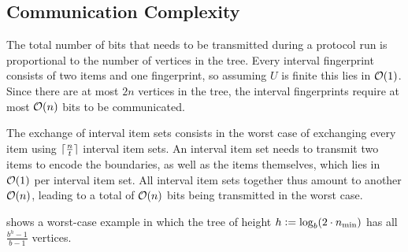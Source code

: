 \subsection{Communication Complexity}
\label{communication-complexity}

The total number of bits that needs to be transmitted during a protocol run is proportional to the number of vertices in the tree. Every interval fingerprint consists of two items and one fingerprint, so assuming $U$ is finite this lies in $\mathcal{O}(1)$. Since there are at most $2n$ vertices in the tree, the interval fingerprints require at most $\mathcal{O}(n)$ bits to be communicated.

The exchange of interval item sets consists in the worst case of exchanging every item using $\lceil\frac{n}{t}\rceil$ interval item sets. An interval item set needs to transmit two items to encode the boundaries, as well as the items themselves, which lies in $\mathcal{O}(1)$ per interval item set. All interval item sets together thus amount to another $\mathcal{O}(n)$, leading to a total of $\mathcal{O}(n)$ bits being transmitted in the worst case.

 shows a worst-case example in which the tree of height $h \vcentcolon= \log_{b}(2 \cdot n_{\min})$ has all $\frac{b^{h} - 1}{b - 1}$ vertices.

